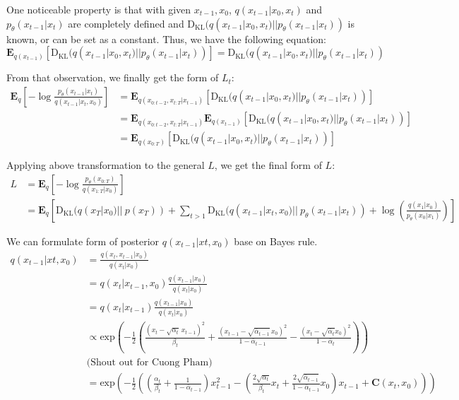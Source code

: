 \documentclass[11pt, oneside]{article}   	%
\begin{document}
One noticeable property is that with given $x_{t-1}, x_{0}$, $q(x_{t-1}| x_{0}, x_{t})$ and $p_{\theta}(x_{t-1}|x_{t})$ are completely defined and $\mathrm{D}_{\mathrm{KL}}(q(x_{t-1}| x_{0}, x_{t}) || p_{\theta}(x_{t-1}|x_{t}))$ is known, or can be set as a constant. Thus, we have the following equation:
\[
\mathbf{E}_{q(x_{t-1})} [\mathrm{D}_{\mathrm{KL}}(q(x_{t-1}| x_{0}, x_{t}) || p_{\theta}(x_{t-1}|x_{t}))] = \mathrm{D}_{\mathrm{KL}}(q(x_{t-1}| x_{0}, x_{t}) || p_{\theta}(x_{t-1}|x_{t}))
\]

From that observation, we finally get the form of $L_{t}$:
\begin{align*}
	\mathbf{E}_{q}\left[- \log \frac{p_{\theta}(x_{t-1}|x_{t})}{q(x_{t-1}|x_{t}, x_{0})} \right] 
	&= \mathbf{E}_{q(x_{0:t-2}, x_{t:T}|x_{t-1})} [\mathrm{D}_{\mathrm{KL}}(q(x_{t-1}| x_{0}, x_{t}) || p_{\theta}(x_{t-1}|x_{t}))] \\
	&= \mathbf{E}_{q(x_{0:t-2}, x_{t:T}|x_{t-1})} \mathbf{E}_{q(x_{t-1})} [\mathrm{D}_{\mathrm{KL}}(q(x_{t-1}| x_{0}, x_{t}) || p_{\theta}(x_{t-1}|x_{t}))] \\
	&= \mathbf{E}_{q(x_{0:T})}[\mathrm{D}_{\mathrm{KL}}(q(x_{t-1}| x_{0}, x_{t}) || p_{\theta}(x_{t-1}|x_{t}))]
\end{align*}

\vspace{1cm}

Applying above transformation to the general $L$, we get the final form of $L$:
\begin{align*}
	L
	&=\mathbf{E}_{q}\left[-\log{\frac{p_{\theta}(x_{0:T})}{q(x_{1:T}|x_{0})}}\right] \\
	&=\mathbf{E}_{q}\left[ \mathrm{D}_{\mathrm{KL}}(q(x_{T}|x_{0})||\:p(x_{T})) + \sum_{t>1}\mathrm{D}_{\mathrm{KL}}(q(x_{t-1}|x_{t}, x_{0}) ||\: p_{\theta}(x_{t-1}|x_{t})) + \log(\frac{q(x_{1}|x_{0})}{p_{\theta}(x_{0}|x_{1})})\right]
\end{align*}

We can formulate form of posterior $q(x_{t-1}|x{t}, x_{0})$ base on Bayes rule.
\begin{align}
	q(x_{t-1}|x{t}, x_{0})
	&= \frac{q(x_{t}, x_{t-1}|x_{0})}{q(x_{t}|x_{0})} \\
	&= q(x_{t}|x_{t-1}, x_{0})\frac{q(x_{t-1}|x_{0})}{q(x_{t}|x_{0})} \\
	&= q(x_{t}|x_{t-1})\frac{q(x_{t-1}|x_{0})}{q(x_{t}|x_{0})} \\
	&\propto \text{exp} \left(- \frac{1}{2}(\frac{(x_{t} - \sqrt{\alpha_{t}}\,x_{t-1})^{2}}{\beta_{t}} + \frac{(x_{t-1}-\sqrt{\bar{\alpha}_{t-1}}\,x_{0})^2}{1 - \bar{\alpha}_{t-1}} - \frac{(x_{t}-\sqrt{\bar{\alpha}_{t}}x_{0})^2}{1-\bar{\alpha}_{t}})\right) \\
	&\text{(Shout out for Cuong Pham)} \nonumber \\
	&= \text{exp} \left(- \frac{1}{2} ((\frac{\alpha_{t}}{\beta_{t}} + \frac{1}{1-\bar{\alpha}_{t-1}})x^{2}_{t-1} - (\frac{2\sqrt{\alpha_{t}}}{\beta_{t}}x_{t} + \frac{2\sqrt{\bar{\alpha}_{t-1}}}{1-\bar{\alpha}_{t-1}}x_{0})x_{t-1} + \mathbf{C}(x_{t}, x_{0}))\right) \label{eq:12}
\end{align}
\end{document}
